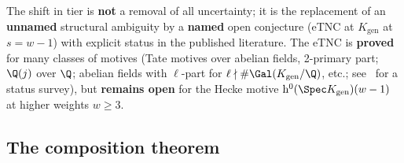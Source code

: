\begin{remark}\label{rk:A3-named-conjecture}
The shift in tier is {\bf not} a removal of all uncertainty; it is the
replacement of an {\bf unnamed} structural ambiguity by a {\bf named}
open conjecture (eTNC at $K_{\mathrm{gen}}$ at $s = w-1$) with explicit
status in the published literature.  The eTNC is {\bf proved} for many
classes of motives (Tate motives over abelian fields, 2-primary part;
$\Q(j)$ over $\Q$; abelian fields with $\ell$-part for $\ell \nmid
\#\Gal(K_{\mathrm{gen}}/\Q)$, etc.; see~\cite{FlachSurvey2004} for a
status survey), but {\bf remains open} for the Hecke motive
$\mathrm{h}^0(\Spec K_{\mathrm{gen}})(w-1)$ at higher weights $w \ge 3$.
\end{remark}

\subsection{The composition theorem}
\label{sec:conjF-A3-COMP}

